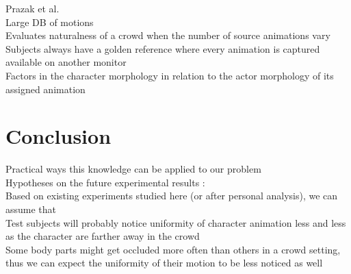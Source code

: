 \documentclass[11pt]{sdm}
\begin{document}
Prazak et al.\cite{pravzak2011perceiving}\\
Large DB of motions\\
Evaluates naturalness of a crowd when the number of source animations vary\\
Subjects always have a golden reference where every animation is captured available on another monitor\\
Factors in the character morphology in relation to the actor morphology of its assigned animation\\ 


\section{Conclusion}
Practical ways this knowledge can be applied to our problem\\
Hypotheses on the future experimental results :\\
Based on existing experiments studied here (or after personal analysis), we can assume that\\
Test subjects will probably notice uniformity of character animation less and less as the character are farther away in the crowd \cite{kulpa2011imperceptible} \cite{mcdonnell2008clone}\\
Some body parts might get occluded more often than others in a crowd setting, thus we can expect the uniformity of their motion to be less noticed as well \cite{mcdonnell2009eye}\\


\newpage
\printbibliography
\end{document}
